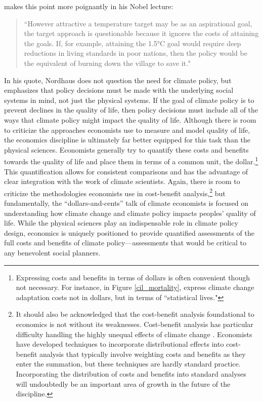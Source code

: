 \cite{nordhaus2019climate} makes this point more poignantly in his Nobel lecture:
\begin{quote}
	``However attractive a temperature target may be as an aspirational goal, the target approach is questionable because it ignores the costs of attaining the goals. If, for example, attaining the 1.5°C goal would require deep reductions in living standards in poor nations, then the policy would be the equivalent of burning down the village to save it."
\end{quote}
In his quote, Nordhaus does not question the need for climate policy, but emphasizes that policy decisions must be made with the underlying social systems in mind, not just the physical systems. If the goal of climate policy is to prevent declines in the quality of life, then policy decisions must include all of the ways that climate policy might impact the quality of life. Although there is room to criticize the approaches economists use to measure and model quality of life, the economics discipline is ultimately far better equipped for this task than the physical sciences. Economists generally try to quantify these costs and benefits towards the quality of life and place them in terms of a common unit, the dollar.\footnote{Expressing costs and benefits in terms of dollars is often  convenient though not necessary. For instance, in Figure \ref{cil_mortality}, \cite{carleton2022valuing} express climate change adaptation costs not in dollars, but in terms of ``statistical lives."} This quantification allows for consistent comparisons and has the advantage of clear integration with the work of climate scientists. Again, there is room to criticize the methodologies economists use in cost-benefit analysis,\footnote{It should also be acknowledged that the cost-benefit analysis foundational to economics is not without its weaknesses. Cost-benefit analysis has particular difficulty handling the highly unequal effects of climate change \citep{kaufman2022how}. Economists have developed techniques to incorporate distributional effects into cost-benefit analysis that typically involve weighting costs and benefits as they enter the summation, but these techniques are hardly standard practice. Incorporating the distribution of costs and benefits into standard analyses will undoubtedly be an important area of growth in the future of the discipline.}  but fundamentally, the ``dollars-and-cents'' talk of climate economists is focused on understanding how climate change and climate policy impacts peoples' quality of life. While the physical sciences play an indispensable role in climate policy design, economics is uniquely positioned to provide quantified assessments of the full costs and benefits of climate policy---assessments that would be critical to any benevolent social planners.

